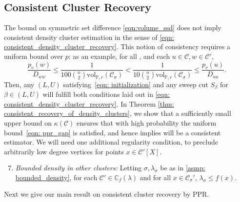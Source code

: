 \documentclass[11pt,twoside]{article}
\newcommand{\vol}{\mathrm{vol}}
\newcommand{\1}{\mathbf{1}}
\newcommand{\pbf}{p}        %
\newcommand{\Xbf}{X}             %
\newcommand{\Pbb}{\mathbb{P}}
\newcommand{\Cbb}{\mathbb{C}}
\newcommand{\Cset}{\mathcal{C}}
\newcommand{\Csig}{\Cset_{\sigma}}
\newcommand{\Cest}{\widehat{C}}
\begin{document}
\subsection{Consistent Cluster Recovery}
The bound on symmetric set difference \eqref{eqn:volume_ssd} does not imply consistent density cluster estimation in the sense of \eqref{eqn: consistent_density_cluster_recovery}. This notion of consistency requires a uniform bound over $\pbf$: as an example, for all \smash{$\Cset'
  \in \Cbb_f(\lambda), \Cset' \neq \Cset$}, and each $u \in \Cset, w \in
\Cset'$,  
\begin{equation}
\label{eqn: ppr_gap}
\frac{\pbf_v(w)}{D_{ww}} \leq \frac{1}{100 {n \choose 2} \vol_{\Pbb,r}(\Csig)} < \frac{1}{10 {n \choose 2} \vol_{\Pbb,r}(\Csig)} \leq \frac{\pbf_v(u)}{D_{uu}}.
\end{equation}
Then, any $(L,U)$ satisfying~\eqref{eqn: initialization} and any sweep cut $S_{\beta}$ for $\beta \in (L,U)$ will fulfill both conditions
laid out in \eqref{eqn: consistent_density_cluster_recovery}. In Theorem
\ref{thm: consistent_recovery_of_density_clusters}, we show that a sufficiently
small upper bound on $\kappa(\Cset)$ ensures that with high probability the uniform bound~\eqref{eqn: ppr_gap} is satisfied, and hence implies \smash{$\Cest$} will be a consistent  
estimator. We will need one additional regularity condition, to preclude arbitrarily low degree
vertices for points $x \in \Cset'[\Xbf]$. 
\begin{enumerate}[label=(A\arabic*)]
  \setcounter{enumi}{6}
\item 
  \label{asmp: C'_bounded_density}
  \emph{Bounded density in other clusters:} Letting $\sigma,\lambda_{\sigma}$ be 
  as in \ref{asmp: bounded_density}, for each $\Cset' \in \Cbb_f(\lambda)$ and
  for all $x \in \Csig'$, $\lambda_{\sigma} \leq f(x)$. 
\end{enumerate}

Next we give our main result on consistent cluster recovery by PPR.
\end{document}
